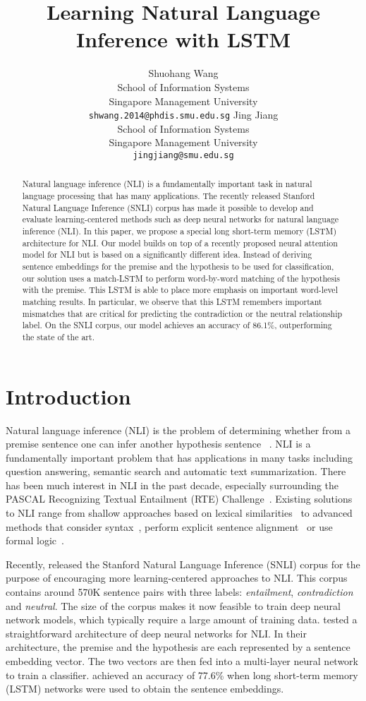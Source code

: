 \documentclass[11pt,letterpaper]{article}
\title{Learning Natural Language Inference with LSTM}
\author{Shuohang Wang\\
		School of Information Systems\\
		Singapore Management University\\
		\texttt{shwang.2014@phdis.smu.edu.sg}
	\And 
	Jing Jiang\\
	School of Information Systems\\
	Singapore Management University\\
	\texttt{jingjiang@smu.edu.sg}}
\date{}
\begin{document}
\maketitle


\begin{abstract}
Natural language inference (NLI) is a fundamentally important task in natural language processing that has many applications.
The recently released Stanford Natural Language Inference (SNLI) corpus has made it possible to develop and evaluate learning-centered methods such as deep neural networks for natural language inference (NLI).
In this paper, we propose a special long short-term memory (LSTM) architecture for NLI.
Our model builds on top of a recently proposed neural attention model for NLI but is based on a significantly different idea.
Instead of deriving sentence embeddings for the premise and the hypothesis to be used for classification, 
our solution uses a match-LSTM to perform word-by-word matching of the hypothesis with the premise.
This LSTM is able to place more emphasis on important word-level matching results.
In particular, we observe that this LSTM remembers important mismatches that are critical for predicting the contradiction or the neutral relationship label.
On the SNLI corpus, our model achieves an accuracy of 86.1\%, outperforming the state of the art.
\end{abstract}
\section{Introduction}

Natural language inference (NLI) is the problem of determining whether from a premise sentence  one can infer another hypothesis sentence ~\cite{maccartney:09}.
NLI is a fundamentally important problem that has applications in many tasks including question answering, semantic search and automatic text summarization.
There has been much interest in NLI in the past decade, especially surrounding the PASCAL Recognizing Textual Entailment (RTE) Challenge~\cite{dagan:pascal05}. 
Existing solutions to NLI range from shallow approaches based on lexical similarities~\cite{glickman:pascal05} to advanced methods that consider syntax~\cite{mehdad:tac09}, perform explicit sentence alignment~\cite{maccartney:emnlp08} or use formal logic~\cite{clark:tac09}.

Recently,  released the Stanford Natural Language Inference (SNLI) corpus for the purpose of encouraging more learning-centered approaches to NLI.
This corpus contains around 570K sentence pairs with three labels: \emph{entailment}, \emph{contradiction} and \emph{neutral}.
The size of the corpus makes it now feasible to train deep neural network models, which typically require a large amount of training data.
 tested a straightforward architecture of deep neural networks for NLI.
In their architecture, the premise and the hypothesis are each represented by a sentence embedding vector.
The two vectors are then fed into a multi-layer neural network to train a classifier.
 achieved an accuracy of 77.6\% when long short-term memory (LSTM) networks were used to obtain the sentence embeddings.
\end{document}
